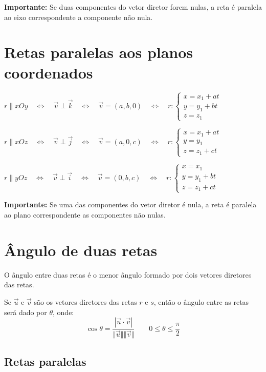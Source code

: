 \textbf{Importante:}  Se duas componentes do vetor diretor forem nulas, a reta  é  paralela  ao  eixo  correspondente a componente não nula.

\section{Retas paralelas aos planos coordenados}

$r\parallel xOy \quad\Longleftrightarrow \quad \vec v \perp \vec k \quad\Longleftrightarrow \quad \vec v=(a,b,0) \quad\Longleftrightarrow \quad r:\left\{ \begin{array}{l}
x=x_1+at\\
y=y_1+bt\\
z=z_1 \end{array} \right.$

$r\parallel xOz \quad\Longleftrightarrow \quad \vec v \perp \vec j \quad\Longleftrightarrow \quad \vec v=(a,0,c) \quad\Longleftrightarrow \quad r:\left\{ \begin{array}{l}
x=x_1+at\\
y=y_1\\
z=z_1+ct \end{array} \right.$

$r\parallel yOz \quad\Longleftrightarrow \quad \vec v \perp \vec i \quad\Longleftrightarrow \quad \vec v=(0,b,c) \quad\Longleftrightarrow \quad r:\left\{ \begin{array}{l}
x=x_1\\
y=y_1+bt\\
z=z_1+ct \end{array} \right.$

\textbf{Importante:} Se uma das componentes do vetor diretor é nula, a reta é  paralela  ao  plano correspondente as componentes não nulas.

\section{Ângulo de duas retas}

O ângulo entre duas retas é o menor ângulo formado por dois vetores diretores das retas.

Se $\vec u$ e $\vec v$ são os vetores diretores das retas $r$ e $s$, então o ângulo entre as retas será dado por $\theta$, onde: $$\cos{\theta}=\frac{|\vec u \cdot \vec v|}{\Vert \vec u \Vert \Vert \vec v \Vert} \qquad 0\leq \theta \leq \frac{\pi}{2}$$

\subsection{Retas paralelas}

